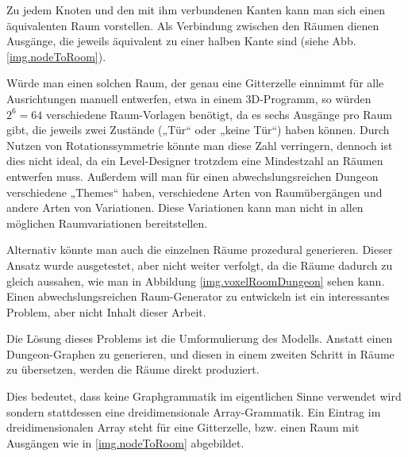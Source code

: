 
Zu jedem Knoten und den mit ihm verbundenen Kanten kann man sich einen äquivalenten Raum vorstellen. Als Verbindung zwischen den Räumen dienen Ausgänge, die jeweils äquivalent zu einer halben Kante sind (siehe Abb. \ref{img.nodeToRoom}).


Würde man einen solchen Raum, der genau eine Gitterzelle einnimmt für alle Ausrichtungen manuell entwerfen, etwa in einem 3D-Programm, so würden $ 2^6 = 64 $ verschiedene Raum-Vorlagen benötigt, da es sechs Ausgänge pro Raum gibt, die jeweils zwei Zustände („Tür“ oder „keine Tür“) haben können. Durch Nutzen von Rotationssymmetrie könnte man diese Zahl verringern, dennoch ist dies nicht ideal, da ein Level-Designer trotzdem eine Mindestzahl an Räumen entwerfen muss. Außerdem will man für einen abwechslungsreichen Dungeon verschiedene „Themes“ haben, verschiedene Arten von Raumübergängen und andere Arten von Variationen. Diese Variationen kann man nicht in allen möglichen Raumvariationen bereitstellen. 

Alternativ könnte man auch die einzelnen Räume prozedural generieren. Dieser Ansatz wurde ausgetestet, aber nicht weiter verfolgt, da die Räume dadurch zu gleich aussahen, wie man in Abbildung \ref{img.voxelRoomDungeon} sehen kann. Einen abwechslungsreichen Raum-Generator zu entwickeln ist ein interessantes Problem, aber nicht Inhalt dieser Arbeit.


Die Lösung dieses Problems ist die Umformulierung des Modells. Anstatt einen Dungeon-Graphen zu generieren, und diesen in einem zweiten Schritt in Räume zu übersetzen, werden die Räume direkt produziert. 

Dies bedeutet, dass keine Graphgrammatik im eigentlichen Sinne verwendet wird sondern stattdessen eine dreidimensionale Array-Grammatik. Ein Eintrag im dreidimensionalen Array steht für eine Gitterzelle, bzw. einen Raum mit Ausgängen wie in \ref{img.nodeToRoom} abgebildet. 

